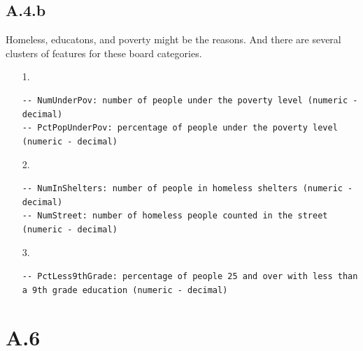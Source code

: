\documentclass[]{article}
\begin{document}
    \subsection*{A.4.b}
        Homeless, educatons, and poverty might be the reasons. And there are several clusters of features for these board categories.
        \begin{enumerate}
            \item[1.] \begin{lstlisting}
-- NumUnderPov: number of people under the poverty level (numeric - decimal)
-- PctPopUnderPov: percentage of people under the poverty level (numeric - decimal)
            \end{lstlisting}
            \item[2.]
            \begin{lstlisting}
-- NumInShelters: number of people in homeless shelters (numeric - decimal)
-- NumStreet: number of homeless people counted in the street (numeric - decimal)
            \end{lstlisting} 
            \item[3.]
            \begin{lstlisting}
-- PctLess9thGrade: percentage of people 25 and over with less than a 9th grade education (numeric - decimal)
            \end{lstlisting} 
        \end{enumerate}
    
        
\section*{A.6}
    
\end{document}
